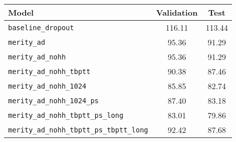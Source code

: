 \begin{tabular}{lcc}
    \toprule
    Model& Validation & Test \\
    \midrule
    \texttt{baseline\_dropout} & 116.11 & 113.44 \\
    \texttt{merity\_ad} & 95.36 & 	91.29 \\
    \texttt{merity\_ad\_nohh} & 95.36 & 91.29 \\
    \texttt{merity\_ad\_nohh\_tbptt} & 90.38 &	87.46 \\
    \texttt{merity\_ad\_nohh\_1024} & 85.85 &	82.74 \\
    \texttt{merity\_ad\_nohh\_1024\_ps} & 87.40 &	83.18 \\
    \texttt{merity\_ad\_nohh\_tbptt\_ps\_long} & 83.01 &	79.86 \\
    \texttt{merity\_ad\_nohh\_tbptt\_ps\_tbptt\_long} & 92.42 &	87.68 \\
    \bottomrule
\end{tabular}